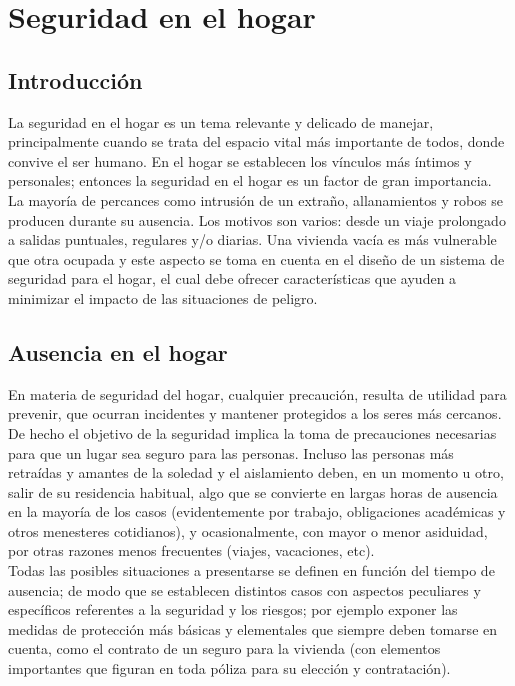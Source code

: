 \chapter{Seguridad en el hogar}



\section{Introducción}
La seguridad en el hogar es un tema relevante y delicado de manejar, principalmente cuando se trata del espacio vital más importante de todos, donde convive el ser humano. En el hogar se establecen los vínculos más íntimos y personales; entonces la seguridad en el hogar es un factor de gran importancia. La mayoría de percances como intrusión de un extraño, allanamientos y robos se producen durante su ausencia. Los motivos son varios: desde un viaje prolongado a salidas puntuales, regulares y/o diarias. Una vivienda vacía es más vulnerable que otra ocupada y este aspecto se toma en cuenta en el diseño de un sistema de seguridad para el hogar, el cual debe ofrecer características que ayuden a minimizar el impacto de las situaciones de peligro.\\

\section{Ausencia en el hogar}
En materia de seguridad del hogar, cualquier precaución, resulta de utilidad para prevenir, que ocurran incidentes y mantener protegidos a los seres más cercanos. De hecho el objetivo de la seguridad implica la toma de precauciones necesarias para que un lugar sea seguro para las personas. Incluso las personas más retraídas y amantes de la soledad y el aislamiento deben, en un momento u otro, salir de su residencia habitual, algo que se convierte en largas horas de ausencia en la mayoría de los casos (evidentemente por trabajo, obligaciones académicas y otros menesteres cotidianos), y ocasionalmente, con mayor o menor asiduidad, por otras razones menos frecuentes (viajes, vacaciones, etc).\\
 
Todas las posibles situaciones a presentarse se definen en función del tiempo de ausencia; de modo que se establecen distintos casos con aspectos peculiares y específicos referentes a la seguridad y los riesgos; por ejemplo exponer las medidas de protección más básicas y elementales que siempre deben tomarse en cuenta, como el contrato de un seguro para la vivienda (con elementos importantes que figuran en toda póliza para su elección y contratación).\\

